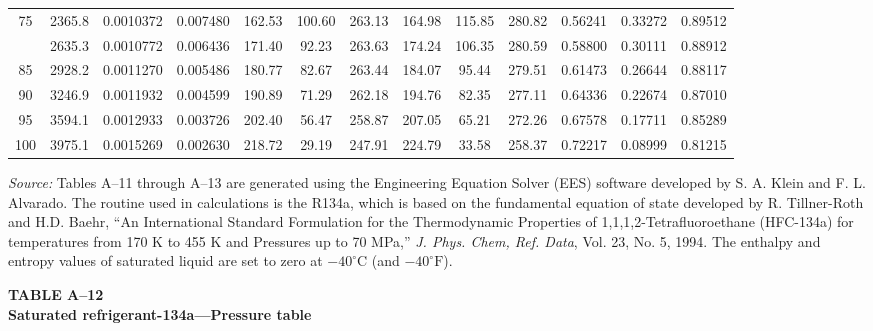 \documentclass[12pt,a3paper]{article}
\begin{document}
\begin{enumerate}
\begin{center}
\begin{longtable}{c c c c c c c c c c c c c}
75 & 2365.8 & 0.0010372 & 0.007480 & 162.53 & 100.60 & 263.13 & 164.98 & 115.85 & 280.82 & 0.56241 & 0.33272 & 0.89512 \\
\addlinespace
80 & 2635.3 & 0.0010772 & 0.006436 & 171.40 & 92.23 & 263.63 & 174.24 & 106.35 & 280.59 & 0.58800 & 0.30111 & 0.88912 \\
85 & 2928.2 & 0.0011270 & 0.005486 & 180.77 & 82.67 & 263.44 & 184.07 & 95.44 & 279.51 & 0.61473 & 0.26644 & 0.88117 \\
90 & 3246.9 & 0.0011932 & 0.004599 & 190.89 & 71.29 & 262.18 & 194.76 & 82.35 & 277.11 & 0.64336 & 0.22674 & 0.87010 \\
95 & 3594.1 & 0.0012933 & 0.003726 & 202.40 & 56.47 & 258.87 & 207.05 & 65.21 & 272.26 & 0.67578 & 0.17711 & 0.85289 \\
100 & 3975.1 & 0.0015269 & 0.002630 & 218.72 & 29.19 & 247.91 & 224.79 & 33.58 & 258.37 & 0.72217 & 0.08999 & 0.81215 \\
\end{longtable}

\vspace{0.2cm}
\noindent\scriptsize \textit{Source:} Tables A--11 through A--13 are generated using the Engineering Equation Solver (EES) software developed by S. A. Klein and F. L. Alvarado. The routine used in calculations is the R134a, which is based on the fundamental equation of state developed by R. Tillner-Roth and H.D. Baehr, ``An International Standard Formulation for the Thermodynamic Properties of 1,1,1,2-Tetrafluoroethane (HFC-134a) for temperatures from 170 K to 455 K and Pressures up to 70 MPa,'' \textit{J. Phys. Chem, Ref. Data}, Vol. 23, No. 5, 1994. The enthalpy and entropy values of saturated liquid are set to zero at $-40^\circ\text{C}$ (and $-40^\circ\text{F}$).

\end{center}

\noindent\textbf{\Large TABLE A--12} \\
\noindent\textbf{\large Saturated refrigerant-134a---Pressure table}
\vspace{0.3cm}


\end{enumerate}
\end{document}
